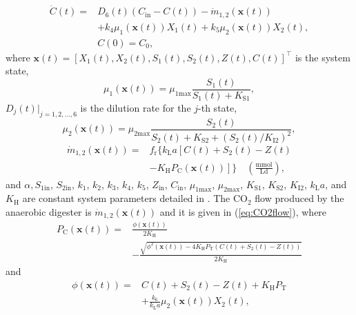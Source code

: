 \documentclass[lettersize,journal]{IEEEtran}
\begin{document}
\begin{equation}
\begin{aligned}
\dot{C}(t) = {} & D_6(t)\left(C_{\text{in}} - C(t)\right) - \dot{m}_{1,2}(\bm{x}(t)) \\
& + k_4\mu_1(\bm{x}(t))X_1(t) + k_5 \mu_2(\bm{x}(t))X_2(t), \label{eq:digester6} \\
& C(0) = C_0,
\end{aligned}
\end{equation}
where $\bm{x}(t) = \left[X_1(t), X_2(t), S_1(t), S_2(t), Z(t), C(t)\right]^\top$ is the system state,
\begin{equation}
\mu_1(\bm{x}(t)) = \mu_{1\text{max}} \frac{S_1(t)}{S_1(t) + K_{\text{S1}}},
\end{equation}
$D_j(t)|_{j = 1, 2, \dots, 6}$ is the dilution rate for the $j$-th state,
\begin{equation}
\mu_2(\bm{x}(t)) = \mu_{2\text{max}} \frac{S_2(t)}{S_2(t) + K_{\text{S2}} + (S_2(t)/K_{\text{I2}})^2}, 
\end{equation}
\begin{equation}\label{eq:CO2flow}
\begin{aligned}
\dot{m}_{1,2}(\bm{x}(t)) = {} & f_\text{r} \{k_{\text{L}}a\left[C(t) + S_2(t) - Z(t) \right. \\
& \left. - K_{\text{H}}P_\text{C}(\bm{x}(t))\right]\} \quad \left(\frac{\text{mmol}}{\text{Ld}}\right),
\end{aligned}
\end{equation}
and $\alpha, S_{1\text{in}}$, $S_{2\text{in}}$, $k_1$, $k_2$, $k_3$, $k_4$, $k_5$, $Z_{\text{in}}$, $C_{\text{in}}$, $\mu_{1\text{max}}$, $\mu_{2\text{max}}$, $K_{\text{S1}}$, $K_{\text{S2}}$, $K_{\text{I2}}$, $k_{\text{L}}a$, and $K_{\text{H}}$ are constant system parameters detailed in \cite{bernard2001dynamical,campos2019hybrid}. The $\text{CO}_2$ flow produced by the anaerobic digester is $\dot{m}_{1,2}(\bm{x}(t))$ and it is given in (\ref{eq:CO2flow}), where 
\begin{equation}
\begin{aligned}
P_\text{C}(\bm{x}(t)) = {} & \frac{\phi(\bm{x}(t))}{2K_{\text{H}}} \\ 
& - \frac{\sqrt{\phi^2(\bm{x}(t)) - 4 K_\text{H}P_{\text{T}} (C(t) + S_2(t) - Z(t))}}{2K_{\text{H}}} 
\end{aligned}
\end{equation} 
and
\begin{equation}
\begin{aligned}
\phi(\bm{x}(t)) = {} & C(t) + S_2(t) - Z(t) + K_{\text{H}}P_{\text{T}} \\ 
& + \frac{k_6}{k_{\text{L}}a}\mu_2(\bm{x}(t))X_2(t),
\end{aligned}
\end{equation}
\end{document}
